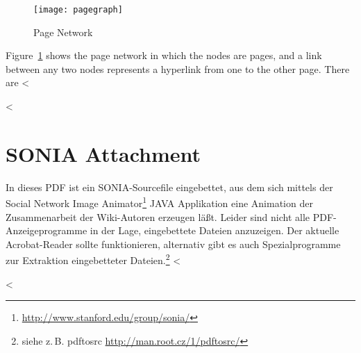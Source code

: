 \documentclass{scrartcl}
\begin{document}
\begin{figure}[htbp]
	\centering
	\texttt{[image: pagegraph]}
	\caption{Page Network}
	\label{fig:page_network}
\end{figure}

Figure~\ref{fig:page_network} shows the page network in which the nodes are pages, and a link between any two nodes represents a hyperlink from one to the other page. There are <%





<%
\section{SONIA Attachment}
In dieses PDF ist ein SONIA-Sourcefile eingebettet, aus dem sich mittels der Social Network Image Animator\footnote{\url{http://www.stanford.edu/group/sonia/}} JAVA Applikation eine Animation der Zusammenarbeit der Wiki-Autoren erzeugen läßt. Leider sind nicht alle PDF-Anzeigeprogramme in der Lage, eingebettete Dateien anzuzeigen. Der aktuelle Acrobat-Reader sollte funktionieren, alternativ gibt es auch Spezialprogramme zur Extraktion eingebetteter Dateien.\footnote{siehe z.\,B. pdftosrc \textlangle\url{http://man.root.cz/1/pdftosrc/}\textrangle}
<%
\bigskip

<%
\end{document}
